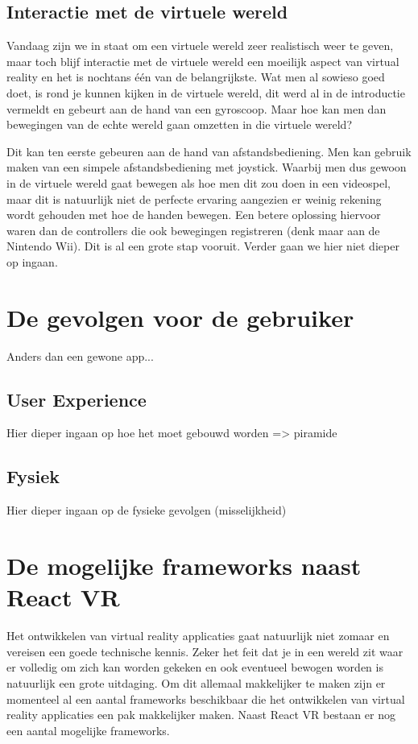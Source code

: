 \subsection{Interactie met de virtuele wereld}
Vandaag zijn we in staat om een virtuele wereld zeer realistisch weer te geven, maar toch blijf interactie met de virtuele wereld een moeilijk aspect van virtual reality en het is nochtans één van de belangrijkste. Wat men al sowieso goed doet, is rond je kunnen kijken in de virtuele wereld, dit werd al in de introductie vermeldt en gebeurt aan de hand van een gyroscoop. Maar hoe kan men dan bewegingen van de echte wereld gaan omzetten in die virtuele wereld?

Dit kan ten eerste gebeuren aan de hand van afstandsbediening. Men kan gebruik maken van een simpele afstandsbediening met joystick. Waarbij men dus gewoon in de virtuele wereld gaat bewegen als hoe men dit zou doen in een videospel, maar dit is natuurlijk niet de perfecte ervaring aangezien er weinig rekening wordt gehouden met hoe de handen bewegen. Een betere oplossing hiervoor waren dan de controllers die ook bewegingen registreren (denk maar aan de Nintendo Wii). Dit is al een grote stap vooruit. Verder gaan we hier niet dieper op ingaan.

\section{De gevolgen voor de gebruiker}
Anders dan een gewone app...

\subsection{User Experience}
Hier dieper ingaan op hoe het moet gebouwd worden => piramide

\subsection{Fysiek}
Hier dieper ingaan op de fysieke gevolgen (misselijkheid)

\section{De mogelijke frameworks naast React VR}
Het ontwikkelen van virtual reality applicaties gaat natuurlijk niet zomaar en vereisen een goede technische kennis. Zeker het feit dat je in een wereld zit waar er volledig om zich kan worden gekeken en ook eventueel bewogen worden is natuurlijk een grote uitdaging. Om dit allemaal makkelijker te maken zijn er momenteel al een aantal frameworks beschikbaar die het ontwikkelen van virtual reality applicaties een pak makkelijker maken. Naast React VR bestaan er nog een aantal mogelijke frameworks.

